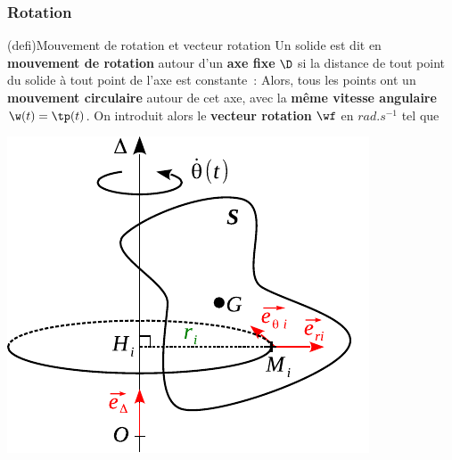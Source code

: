 \documentclass[../../main/main.tex]{subfiles}
\begin{document}
\subsubsection{Rotation}
\begin{tcb*}[sidebyside, righthand ratio=.4](defi){Mouvement de rotation et vecteur rotation}
	Un solide est dit en \textbf{mouvement de rotation} autour d'un \textbf{axe
		fixe} $\D$ si la distance de tout point du solide à tout point de l'axe est constante~:
	\psw{
		\[
			\forall \Mr \in \Sc, \forall A \in \Delta, \quad \norm{\vvr{AM}} = \cte
		\]
	}%
	Alors, tous les points ont un \textbf{mouvement circulaire} autour de cet
	axe, avec la \textbf{même vitesse angulaire} $\w(t) = \tp(t)$.
	\smallbreak
	On introduit alors le \textbf{vecteur rotation} $\wf$
	en $\si{rad.s^{-1}}$ tel que
	\psw{
		\[
			\boxed{\wf_{\Sc/\Rc} = \w(t)\vv{u_\D}}
		\]
	}
	\vspace{-15pt}
	\tcblower
	\begin{center}
		\includegraphics[width=.8\linewidth]{sol_rot}
	\end{center}
\end{tcb*}
\end{document}
